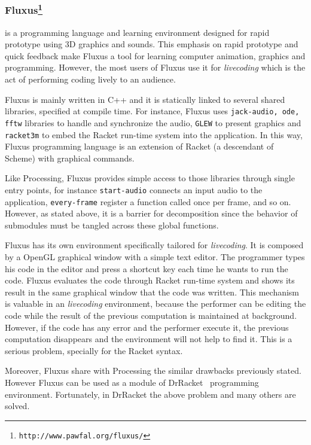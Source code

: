 \subsubsection{Fluxus\protect\footnote{\texttt{http://www.pawfal.org/fluxus/}}} is a programming language and learning environment designed for rapid prototype using 3D graphics and sounds. This emphasis on rapid prototype and quick feedback make Fluxus a tool for learning computer animation, graphics and programming. However, the most users of Fluxus use it for \textit{livecoding} which is the act of performing coding lively to an
audience.

Fluxus is mainly written in C++ and it is statically linked to several shared libraries, specified at compile time. For instance, Fluxus uses \texttt{jack-audio, ode, fftw} libraries to handle and synchronize the audio, \texttt{GLEW} to present graphics and \texttt{racket3m} to embed the Racket run-time system into the application. In this way, Fluxus programming language is an extension of Racket (a descendant of Scheme) with graphical commands. 

Like Processing, Fluxus provides simple access to those libraries through single entry points, for instance \texttt{start-audio} connects an input audio to the application, \texttt{every-frame} register a function called once per frame, and so on. However, as stated above, it is a barrier for decomposition since the behavior of submodules must be tangled across these global functions.

Fluxus has its own environment specifically tailored for \textit{livecoding}. It is composed by a OpenGL graphical window with a simple text editor. The programmer types his code in the editor and press a shortcut key each time he wants to run the code. Fluxus evaluates the code through Racket run-time system and shows its result in the same graphical window that the code was written. This mechanism is valuable in an \textit{livecoding} environment, because the performer can be editing the code while the result of the previous computation is maintained at background. However, if the code has any error and the performer execute it, the previous computation disappears and the environment will not help to find it. This is a serious problem, specially for the Racket syntax.

Moreover, Fluxus share with Processing the similar drawbacks previously stated. However Fluxus can be used as a module of DrRacket~\cite{findler2002drscheme} programming environment. Fortunately, in DrRacket the above problem and many others are solved.
